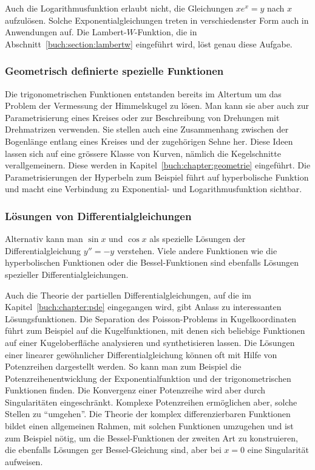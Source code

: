 Auch die Logarithmusfunktion erlaubt nicht, die Gleichungen $xe^x=y$
nach $x$ aufzulösen.
Solche Exponentialgleichungen treten in verschiedenster Form auch in 
Anwendungen auf.
Die Lambert-$W$-Funktion, die in Abschnitt~\ref{buch:section:lambertw}
eingeführt wird, löst genau diese Aufgabe.


%
%
\subsubsection{Geometrisch definierte spezielle Funktionen}
Die trigonometrischen Funktionen entstanden bereits im Altertum
um das Problem der Vermessung der Himmelskugel zu lösen.
Man kann sie aber auch zur Parametrisierung eines Kreises oder
zur Beschreibung von Drehungen mit Drehmatrizen verwenden.
Sie stellen auch eine Zusammenhang zwischen der Bogenlänge 
entlang eines Kreises und der zugehörigen Sehne her.
Diese Ideen lassen sich auf eine grössere Klasse von Kurven,
nämlich die Kegelschnitte verallgemeinern.
Diese werden in Kapitel~\ref{buch:chapter:geometrie} eingeführt.
Die Parametrisierungen der Hyperbeln zum Beispiel führt auf
hyperbolische Funktion und macht eine Verbindung zu Exponential-
und Logarithmusfunktion sichtbar.

%
%
\subsubsection{Lösungen von Differentialgleichungen}
Alternativ kann man $\sin x$ und $\cos x$ als spezielle Lösungen der
Differentialgleichung $y''=-y$ verstehen.
Viele andere Funktionen wie die hyperbolischen Funktionen oder die
Bessel-Funktionen sind ebenfalls Lösungen spezieller Differentialgleichungen.

Auch die Theorie der partiellen Differentialgleichungen, auf die
im Kapitel~\ref{buch:chapter:pde} eingegangen wird, gibt Anlass
zu interessanten Lösungsfunktionen.
Die Separation des Poisson-Problems in Kugelkoordinaten führt zum Beispiel
auf die Kugelfunktionen, mit denen sich beliebige Funktionen auf einer
Kugeloberfläche analysieren und synthetisieren lassen.
Die Lösungen einer linearer gewöhnlicher Differentialgleichung können
oft mit Hilfe von Potenzreihen dargestellt werden.
So kann man zum Beispiel die Potenzreihenentwicklung der Exponentialfunktion
und der trigonometrischen Funktionen finden.
Die Konvergenz einer Potenzreihe wird aber durch Singularitäten
eingeschränkt.
Komplexe Potenzreihen ermöglichen aber, solche Stellen zu ``umgehen''.
Die Theorie der komplex differenzierbaren Funktionen bildet einen
allgemeinen Rahmen, mit solchen Funktionen umzugehen und ist zum 
Beispiel nötig, um die Bessel-Funktionen der zweiten Art zu konstruieren,
die ebenfalls Lösungen ger Bessel-Gleichung sind, aber bei $x=0$
eine Singularität aufweisen.

